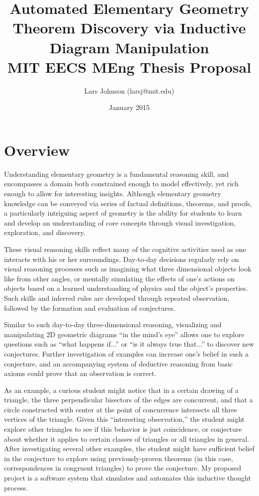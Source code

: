 \documentclass[10pt]{article}
\title{Automated Elementary Geometry Theorem Discovery via Inductive
  Diagram Manipulation\\ {\large MIT EECS MEng Thesis Proposal}}
\author{Lars Johnson (larsj@mit.edu)} \date{January 2015}
\begin{document}
\pagestyle{myheadings} \maketitle
\onehalfspacing {}
\section{Overview}
Understanding elementary geometry is a fundamental reasoning skill,
and encompasses a domain both constrained enough to model effectively,
yet rich enough to allow for interesting insights.  Although
elementary geometry knowledge can be conveyed via series of factual
definitions, theorems, and proofs, a particularly intriguing aspect of
geometry is the ability for students to learn and develop an
understanding of core concepts through visual investigation,
exploration, and discovery.

These visual reasoning skills reflect many of the cognitive activities
used as one interacts with his or her surroundings.  Day-to-day
decisions regularly rely on visual reasoning processes such as
imagining what three dimensional objects look like from other angles,
or mentally simulating the effects of one's actions on objects based
on a learned understanding of physics and the object's properties.
Such skills and inferred rules are developed through repeated
observation, followed by the formation and evaluation of conjectures.

Similar to such day-to-day three-dimensional reasoning, visualizing
and manipulating 2D geometric diagrams ``in the mind's eye'' allows
one to explore questions such as ``what happens if...''  or ``is it
always true that...''  to discover new conjectures.  Further
investigation of examples can increase one's belief in such a
conjecture, and an accompanying system of deductive reasoning from
basic axioms could prove that an observation is correct.

As an example, a curious student might notice that in a certain
drawing of a triangle, the three perpendicular bisectors of the edges
are concurrent, and that a circle constructed with center at the point
of concurrence intersects all three vertices of the triangle.  Given
this ``interesting observation,'' the student might explore other
triangles to see if this behavior is just coincidence, or conjecture
about whether it applies to certain classes of triangles or all
triangles in general.  After investigating several other examples, the
student might have sufficient belief in the conjecture to explore
using previously-proven theorems (in this case, correspondences in
congruent triangles) to prove the conjecture.  My proposed project is
a software system that simulates and automates this inductive thought
process.
\end{document}
